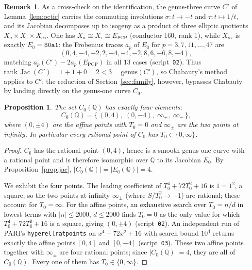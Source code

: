 \documentclass[11pt,reqno]{amsart}
\theoremstyle{plain}
\newtheorem{proposition}[theorem]{Proposition}
\theoremstyle{definition}
\newtheorem{remark}[theorem]{Remark}
\newcommand{\Q}{\mathbb{Q}}
\DeclareMathOperator{\Jac}{Jac}
\begin{document}
\begin{remark}
As a cross-check on the identification, the genus-three curve $C'$ of
Lemma~\ref{lem:octic} carries the commuting involutions $\sigma:t\mapsto-t$ and
$\tau:t\mapsto1/t$, and its Jacobian decomposes up to isogeny as a product of
three elliptic quotients $X_\sigma\times X_\tau\times X_{\sigma\tau}$. One has
$X_\sigma\cong X_\tau\cong E_{\mathrm{PCP}}$ (conductor $160$, rank $1$), while
$X_{\sigma\tau}$ is exactly $E_0=\texttt{80a1}$: the Frobenius traces $a_p$ of
$E_0$ for $p=3,7,11,\dots,47$ are
\[
(0,4,-4,-2,2,-4,-4,-2,8,6,-6,8,-4),
\]
matching $a_p(C')-2a_p(E_{\mathrm{PCP}})$ in all $13$ cases
(script~\texttt{02}). Thus $\mathrm{rank}\,\Jac(C')=1+1+0=2<3=\mathrm{genus}(C')$,
so Chabauty's method applies to $C'$; the reduction of
Section~\ref{sec:family}, however, bypasses Chabauty by landing directly on the
genus-one curve $C_0$.
\end{remark}

\begin{proposition}\label{prop:C0pts}
The set $C_0(\Q)$ has exactly four elements:
\[
C_0(\Q)=\{\,(0,4),\;(0,-4),\;\infty_{+},\;\infty_{-}\,\},
\]
where $(0,\pm4)$ are the affine points with $T_0=0$ and $\infty_{\pm}$ are the
two points at infinity. In particular every rational point of $C_0$ has
$T_0\in\{0,\infty\}$.
\end{proposition}

\begin{proof}
$C_0$ has the rational point $(0,4)$, hence is a smooth genus-one curve with a
rational point and is therefore isomorphic over $\Q$ to its Jacobian $E_0$.
By Proposition~\ref{prop:jac}, $|C_0(\Q)|=|E_0(\Q)|=4$.

We exhibit the four points. The leading coefficient of $T_0^4+72T_0^2+16$ is
$1=1^2$, a square, so the two points at infinity $\infty_{\pm}$ (where
$S/T_0^2\to\pm1$) are rational; these account for $T_0=\infty$. For the affine
points, an exhaustive search over $T_0=n/d$ in lowest terms with $|n|\le2000$,
$d\le2000$ finds $T_0=0$ as the only value for which $T_0^4+72T_0^2+16$ is a
square, giving $(0,\pm4)$ (script~\texttt{02}). An independent run of PARI's
\texttt{hyperellratpoints} on $x^4+72x^2+16$ with search bound $10^4$ returns
exactly the affine points $[0,4]$ and $[0,-4]$
(script~\texttt{03}). These two affine points together with $\infty_{\pm}$ are
four rational points; since $|C_0(\Q)|=4$, they are all of $C_0(\Q)$. Every one
of them has $T_0\in\{0,\infty\}$.
\end{proof}
\end{document}
